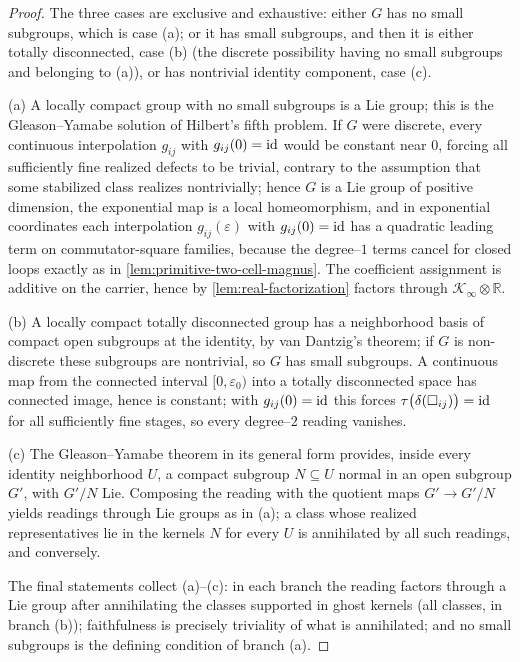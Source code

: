 \begin{proof}
	The three cases are exclusive and exhaustive: either \(G\) has no
	small subgroups, which is case \textup{(a)}; or it has small
	subgroups, and then it is either totally disconnected, case
	\textup{(b)} (the discrete possibility having no small subgroups and
	belonging to \textup{(a)}), or has nontrivial identity component,
	case \textup{(c)}.

	\textup{(a)}  A locally compact group with no small subgroups is a
	Lie group; this is the Gleason--Yamabe solution of Hilbert's fifth
	problem.  If \(G\) were discrete, every continuous interpolation
	\(g_{ij}\) with \(g_{ij}(0)=\operatorname{id}\) would be constant near \(0\),
	forcing all sufficiently fine realized defects to be trivial,
	contrary to the assumption that some stabilized class realizes
	nontrivially; hence \(G\) is a Lie group of positive dimension, the
	exponential map is a local homeomorphism, and in exponential
	coordinates each interpolation \(g_{ij}(\varepsilon)\) with
	\(g_{ij}(0)=\operatorname{id}\) has a quadratic leading term on commutator-square
	families, because the degree--\(1\) terms cancel for closed loops
	exactly as in \cref{lem:primitive-two-cell-magnus}.  The coefficient
	assignment is additive on the carrier, hence by
	\cref{lem:real-factorization} factors through
	\(\mathcal K_\infty\otimes\mathbb R\).

	\textup{(b)}  A locally compact totally disconnected group has a
	neighborhood basis of compact open subgroups at the identity, by van
	Dantzig's theorem; if \(G\) is non-discrete these subgroups are
	nontrivial, so \(G\) has small subgroups.  A continuous map from the
	connected interval \([0,\varepsilon_0)\) into a totally disconnected
	space has connected image, hence is constant; with
	\(g_{ij}(0)=\operatorname{id}\) this forces
	\(\tau\bigl(\delta(\square_{ij})\bigr)=\operatorname{id}\) for all sufficiently
	fine stages, so every degree--\(2\) reading vanishes.

	\textup{(c)}  The Gleason--Yamabe theorem in its general form
	provides, inside every identity neighborhood \(U\), a compact
	subgroup \(N\subseteq U\) normal in an open subgroup \(G'\), with
	\(G'/N\) Lie.  Composing the reading with the quotient maps
	\(G'\to G'/N\) yields readings through Lie groups as in
	\textup{(a)}; a class whose realized representatives lie in the
	kernels \(N\) for every \(U\) is annihilated by all such readings,
	and conversely.

	The final statements collect \textup{(a)}--\textup{(c)}: in each
	branch the reading factors through a Lie group after annihilating
	the classes supported in ghost kernels (all classes, in branch
	\textup{(b)}); faithfulness is precisely triviality of what is
	annihilated; and no small subgroups is the defining condition of
	branch \textup{(a)}.
\end{proof}
